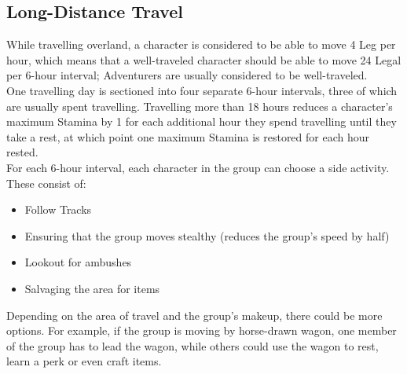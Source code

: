 \subsection{Long-Distance Travel}
While travelling overland, a character is considered to be able to move 4 Leg per hour, which means that a well-traveled character should be able to move 24 Legal per 6-hour interval; Adventurers are usually considered to be well-traveled.\\

One travelling day is sectioned into four separate 6-hour intervals, three of which are usually spent travelling. Travelling more than 18 hours reduces a character's maximum Stamina by 1 for each additional hour they spend travelling until they take a rest, at which point one maximum Stamina is restored for each hour rested.\\

For each 6-hour interval, each character in the group can choose a side activity. These consist of:
\begin{itemize}
	\item Follow Tracks
	
	\item Ensuring that the group moves stealthy (reduces the group's speed by half)
	
	\item Lookout for ambushes
	
	\item Salvaging the area for items
	
\end{itemize}

Depending on the area of travel and the group's makeup, there could be more options. For example, if the group is moving by horse-drawn wagon, one member of the group has to lead the wagon, while others could use the wagon to rest, learn a perk or even craft items.